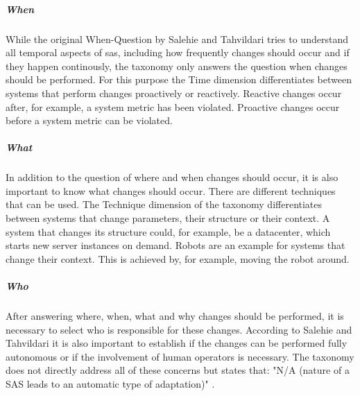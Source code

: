 \subparagraph*{When}
While the original When-Question by Salehie and Tahvildari tries to understand all temporal aspects of \acrshort{sas},
including how frequently changes should occur and if they happen continously,
the taxonomy only answers the question when changes should be performed.
For this purpose the Time dimension differentiates between systems that perform changes proactively or reactively.
Reactive changes occur after, for example, a system metric has been violated.
Proactive changes occur before a system metric can be violated.

\subparagraph*{What}
In addition to the question of where and when changes should occur, it is also important to know
what changes should occur. There are different techniques that can be used.
The Technique dimension of the taxonomy differentiates between systems that change parameters, their structure or their context.
A system that changes its structure could, for example, be a datacenter, which starts new server instances on demand.
Robots are an example for systems that change their context.
This is achieved by, for example, moving the robot around.

\subparagraph*{Who}
After answering where, when, what and why changes should be performed, 
it is necessary to select who is responsible for these changes.
According to Salehie and Tahvildari it is also important to establish if the changes can be performed fully autonomous
or if the involvement of human operators is necessary.
The taxonomy does not directly address all of these concerns but states that:
"N/A (nature of a SAS leads to an automatic type of adaptation)" \cite{SurveyOnEngineeringApproaches}.

